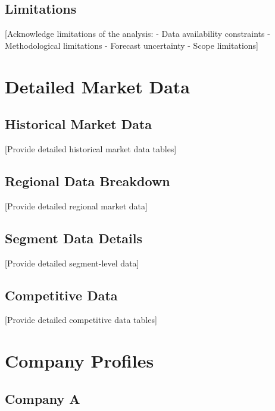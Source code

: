 \documentclass[11pt,letterpaper]{report}
\begin{document}
\section{Limitations}

[Acknowledge limitations of the analysis:
- Data availability constraints
- Methodological limitations
- Forecast uncertainty
- Scope limitations]

\chapter{Detailed Market Data}

\section{Historical Market Data}

[Provide detailed historical market data tables]

\section{Regional Data Breakdown}

[Provide detailed regional market data]

\section{Segment Data Details}

[Provide detailed segment-level data]

\section{Competitive Data}

[Provide detailed competitive data tables]

\chapter{Company Profiles}

\section{Company A}
\end{document}
